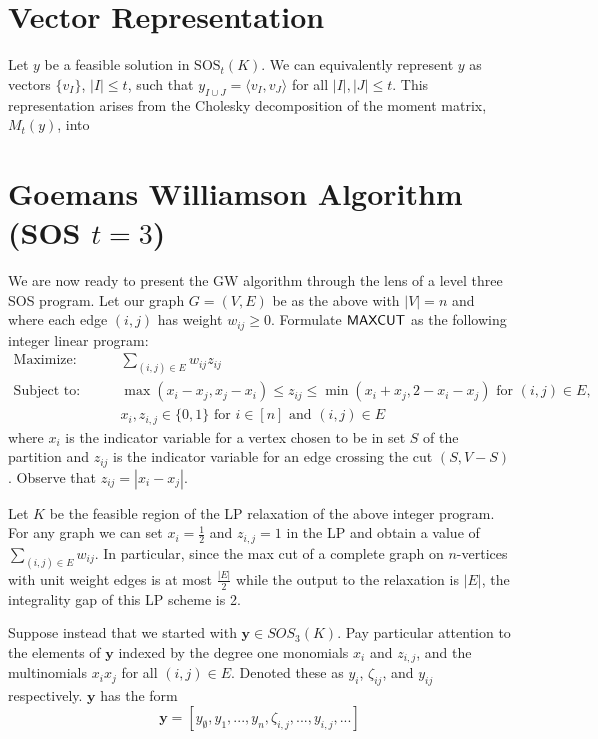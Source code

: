 \documentclass[
10pt, %
letterpaper, %
onecolumn, %
]{article}
\begin{document}
\section{Vector Representation}

Let $y$ be a feasible solution in $\text{SOS}_t(K)$. We can equivalently represent $y$ as vectors $\{v_I\}$, $|I| \le t$, such that $y_{I \cup J} = \langle v_I, v_J \rangle$ for all $|I|,|J| \le t$. This representation arises from the Cholesky decomposition of the moment matrix, $M_t(y)$, into 

\section{Goemans Williamson Algorithm (SOS $t = 3$)}
We are now ready to present the GW algorithm through the lens of a level three SOS program. Let our graph $G = (V, E)$ be as the above with $|V| = n$ and where each edge $(i,j)$ has weight $w_{ij} \geq 0$. Formulate $\mathsf{MAXCUT}$ as the following integer linear program:
\begin{align*}
\mbox{Maximize: }\qquad & \sum_{(i,j)\in E}w_{ij}z_{ij}\\
\mbox{Subject to: }\qquad & \max(x_i - x_j, x_j - x_i) \leq z_{ij} \leq \min(x_i + x_j, 2 - x_i - x_j) \mbox{ for }(i,j) \in E,\\
&x_i, z_{i,j}\in \{0, 1\} \mbox{ for }i \in [n]\mbox{ and }(i,j) \in E
\end{align*}
where $x_i$ is the indicator variable for a vertex chosen to be in set $S$ of the partition and $z_{ij}$ is the indicator variable for an edge crossing the cut $(S, V-S)$. Observe that $z_{ij} = |x_i - x_j|$. 

Let $K$ be the feasible region of the LP relaxation of the above integer program. For any graph we can set $x_i = \frac{1}{2}$ and $z_{i,j} = 1$ in the LP and obtain a value of $\sum_{(i,j)\in E}w_{ij}$. In particular, since the max cut of a complete graph on $n$-vertices with unit weight edges is at most $\frac{|E|}{2}$ while the output to the relaxation is $|E|$, the integrality gap of this LP scheme is 2.

Suppose instead that we started with $\mathbf{y} \in SOS_3(K)$. Pay particular attention to the elements of $\mathbf{y}$ indexed by the degree one monomials $x_i$ and $z_{i,j}$, and the multinomials $x_ix_j$ for all $(i,j) \in E$. Denoted these as $y_{i}$, $\zeta_{ij}$, and $y_{ij}$ respectively. $\mathbf{y}$ has the form
\[\mathbf{y} = [y_{\emptyset}, y_1, ..., y_{n}, \zeta_{i,j}, ..., y_{i,j}, ...]\]
\end{document}
